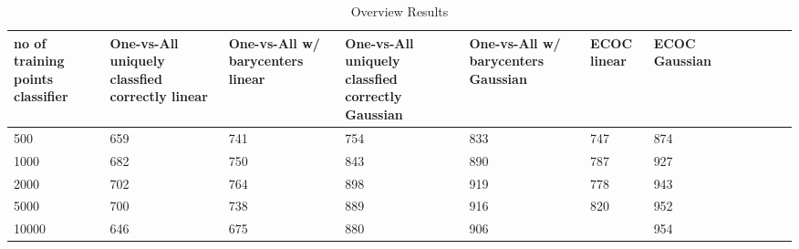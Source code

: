 \begin{table}[ht!]
	\centering
	\caption{Overview Results}
	\begin{tabular}{|l|l|l|l|l|l|l|l|l|l|l|l|} \hline
\multicolumn{1}{|p{2cm}|}{no of training points classifier} & \multicolumn{1}{p{2cm}|}{One-vs-All uniquely classfied correctly linear} & \multicolumn{1}{p{2cm}|}{One-vs-All w/ barycenters linear} & \multicolumn{1}{p{2cm}|}{One-vs-All uniquely classfied correctly Gaussian} &  \multicolumn{1}{p{2cm}|}{One-vs-All w/ barycenters Gaussian} & \multicolumn{1}{p{2cm}|}{ECOC linear} & \multicolumn{1}{p{2cm}|}{ECOC Gaussian} \\ \hline \hline
	500	& 659 & 741 & 754 & 833 & 747 & 874 \\ \hline
	1000	& 682 & 750 & 843 & 890 & 787 & 927 \\ \hline
	2000	& 702 & 764 & 898 & 919 & 778 & 943 \\ \hline
	5000	& 700 & 738 & 889 & 916 & 820 & 952 \\ \hline
	10000	& 646 & 675 & 880 & 906 &  & 954 \\ \hline
	\end{tabular}
\end{table}


